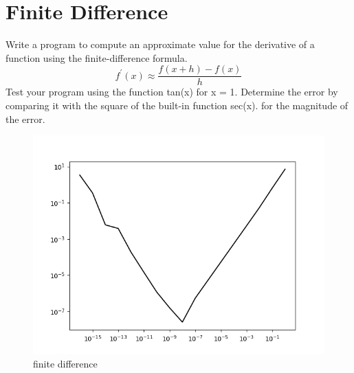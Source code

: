 \documentclass{article}
\begin{document}
\pagebreak
\section{Finite Difference}
 Write a program to compute an approximate value for the derivative of a function
using the finite-difference formula.
$$ f^{\prime}(x) \approx \frac{f(x+h)-f(x)}{h}$$
Test your program using the function tan(x) for x = 1. Determine the error by
comparing it with the square of the built-in function sec(x). 
for the magnitude of the error.
    \begin{figure}[hbt!]
        \centering
        \includegraphics[width=.75\linewidth]{finite_diff.png}
        \caption{ finite difference}
        \label{fig: finite diffrence}
    \end{figure}
    
\end{document}

